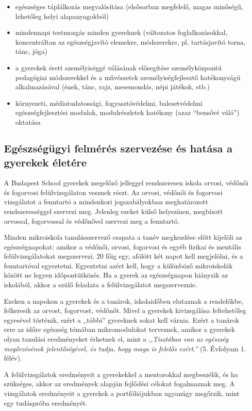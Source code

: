 \begin{itemize}

    \item
          egészséges táplálkozás megvalósítása (elsősorban megfelelő, magas minőségű, lehetőleg helyi alapanyagokból)
    \item
          mindennapi testmozgás minden gyereknek (változatos foglalkozásokkal, koncentráltan az egészségjavító elemekre, módszerekre, pl. tartásjavító torna, tánc, jóga)
    \item
          a gyerekek érett személyiséggé válásának elősegítése személyközpontú pedagógiai módszerekkel és a művészetek személyiségfejlesztő hatékonyságú alkalmazásával (ének, tánc, rajz, mesemondás, népi játékok, stb.)
    \item
          környezeti, médiatudatossági, fogyasztóvédelmi, balesetvédelmi egészségfejlesztési modulok, modulrészletek hatékony (azaz ``bensővé váló'') oktatása
\end{itemize}

\subsection{Egészségügyi felmérés szervezése és hatása a gyerekek életére}
A Budapest School gyerekek megelőző jelleggel rendszeresen iskola orvosi, védőnői és fogorvosi felülvizsgálaton vesznek részt.  Az orvosi, védőnői és fogorvosi vizsgálatot a fenntartó a mindenkori jogszabályokban meghatározott rendszerességgel szervezi meg. Jelenleg ezeket külső helyszínen, megbízott orvossal, fogorvossal és védőnővel szervezi meg a fenntartó.
 
Minden mikroiskola tanulásszervező csapata a tanév megkezdése előtt kijelöli az egészségnapokat: amikor a védőnői, orvosi, fogorvosi és egyéb fizikai és mentális felülvizsgálatokat megszervezi. 20 főig egy, afölött két napot kell megjelölni, és a fenntartóval egyeztetni. Egyeztetni azért kell, hogy a különböző mikroiskolák között ne legyen időpontütközés. Ha a gyerek az egészségnapon hiányzik az iskolából, akkor a szülő feladata a felülvizsgálatot megszerveznie.
 
Ezeken a napokon a gyerekek és a tanárok, iskolaidőben elutaznak a rendelőkbe, felkeresik az orvost, fogorvost, védőnőt. Mivel a gyerekek kivizsgálása feltehetőleg egyesével történik, ezért a ,,többi” gyereknek sokat kell várnia. Ezért a tanárok erre az időre egészség témában mikromodulokat terveznek, amikor a gyerekek olyan tanulási eredményeket érhetnek el, mint a \emph{,,Tisztában van az egészség megőrzésének jelentőségével, és tudja, hogy maga is felelős ezért.''} (5. Évfolyam 1. félév).
 
A felülvizsgálatok eredményeit a gyerekekkel a mentorokkal megbeszélik, és ha szükséges, akkor az eredmények alapján fejlődési célokat fogalmaznak meg. A vizsgálatok eredményeit a gyerekek a portfóliójukban ugyanúgy megőrzik, mint egy tudáspróba eredményét.
 
